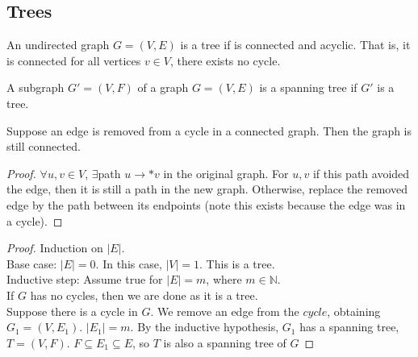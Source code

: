 \documentclass[a4paper]{article}
\theoremstyle{plain}
\newtheorem{thm}{Theorem}[section]
\theoremstyle{definition}
\newtheorem{defn}{Definition}[section]
\theoremstyle{remark}
\begin{document}
\subsection{Trees}
\begin{tcolorbox}[colback=black!3!white,colframe=black!60!white,title=\begin{defn}Tree \label{Tree}\end{defn}]
An undirected graph $G=(V,E)$ is a tree if is connected and acyclic. That is, it is connected for all vertices $v \in V$, there exists no cycle.
\end{tcolorbox}
\begin{tcolorbox}[colback=black!3!white,colframe=black!60!white,title=\begin{defn}Spanning Tree \label{Spanning Tree}\end{defn}]
A subgraph $G'=(V,F)$ of a graph $G=(V,E)$ is a spanning tree if $G'$ is a tree.
\end{tcolorbox}
\begin{tcolorbox}[colback=black!3!white,colframe=black!60!white,title=\begin{thm}Connectivity of cycles \label{Connectivity of cycles}\end{thm}]
	Suppose an edge is removed from a cycle in a connected graph. Then the graph is still connected.
	\begin{proof}
		$\forall u,v \in V$, $\exists $path $u \to *v$ in the original graph. For $u,v$ if this path avoided the edge, then it is still a path in the new graph. Otherwise, replace the removed edge by the path between its endpoints (note this exists because the edge was in a cycle).
	\end{proof}
\end{tcolorbox}
\begin{tcolorbox}[colback=black!3!white,colframe=black!60!white,title=\begin{thm}Every graph has a spanning tree \label{Every graph has a spanning tree}\end{thm}]
	\begin{proof}
		Induction on $|E|$. \\
		Base case: $|E|=0$. In this case, $|V| =1$. This is a tree. \\
		Inductive step: Assume true for $|E| = m$, where $m \in \mathbb{N}$. \\
		If $G$ has no cycles, then we are done as it is a tree. \\
		Suppose there is a cycle in $G$. We remove an edge from the $cycle$, obtaining $G_1 = (V,E_1)$. $|E_1| = m$. By the inductive hypothesis, $G_1$ has a spanning tree, $T=(V,F)$. $F \subseteq E_1 \subseteq E$, so $T$ is also a spanning tree of $G$
	\end{proof}
\end{tcolorbox}
\end{document}
